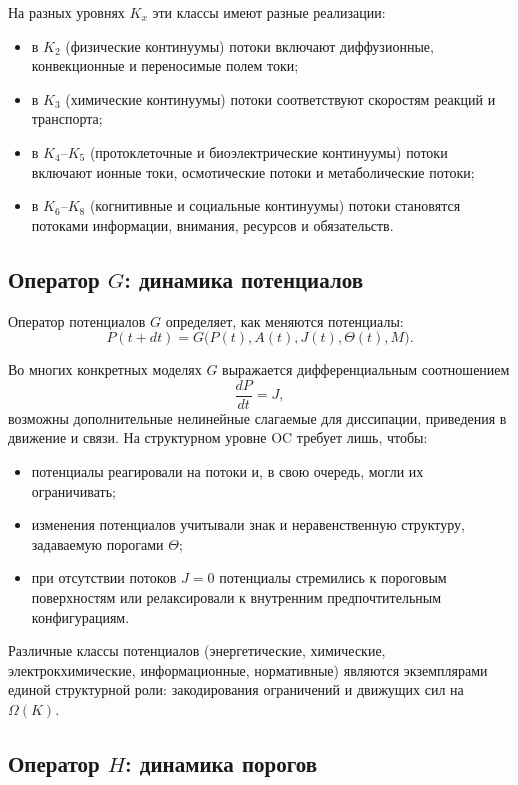 На разных уровнях \(K_x\) эти классы имеют разные реализации:
\begin{itemize}
  \item в \(K_2\) (физические континуумы) потоки включают диффузионные,
        конвекционные и переносимые полем токи;
  \item в \(K_3\) (химические континуумы) потоки соответствуют скоростям
        реакций и транспорта;
  \item в \(K_4\)–\(K_5\) (протоклеточные и биоэлектрические
        континуумы) потоки включают ионные токи, осмотические потоки и
        метаболические потоки;
  \item в \(K_6\)–\(K_8\) (когнитивные и социальные континуумы) потоки
        становятся потоками информации, внимания, ресурсов и обязательств.
\end{itemize}

\subsection{Оператор \texorpdfstring{\texorpdfstring{$G$}{G}}{G}: динамика потенциалов}

Оператор потенциалов \(G\) определяет, как меняются потенциалы:
\[
  P(t+dt) = G\big(P(t), A(t), J(t), \Theta(t), M\big).
\]

Во многих конкретных моделях \(G\) выражается дифференциальным соотношением
\[
  \frac{dP}{dt} = J,
\]
возможны дополнительные нелинейные слагаемые для диссипации, приведения в
движение и связи. На структурном уровне OC требует лишь, чтобы:
\begin{itemize}
  \item потенциалы реагировали на потоки и, в свою очередь, могли их
        ограничивать;
  \item изменения потенциалов учитывали знак и неравенственную структуру,
        задаваемую порогами \(\Theta\);
  \item при отсутствии потоков \(J = 0\) потенциалы стремились к пороговым
        поверхностям или релаксировали к внутренним предпочтительным
        конфигурациям.
\end{itemize}

Различные классы потенциалов (энергетические, химические, электрокхимические,
информационные, нормативные) являются экземплярами единой структурной роли:
закодирования ограничений и движущих сил на \(\Omega(K)\).

\subsection{Оператор \texorpdfstring{\texorpdfstring{$H$}{H}}{H}: динамика порогов}

